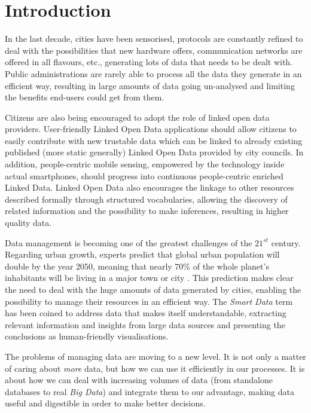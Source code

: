 \section{Introduction}
\label{sec:introduction}

In the last decade, cities have been sensorised, protocols are constantly refined to deal with the possibilities that new hardware offers, communication networks are offered in all flavours, etc., generating lots of data that needs to be dealt with. Public administrations are rarely able to process all the data they generate in an efficient way, resulting in large amounts of data going un-analysed and limiting the benefits end-users could get from them.

Citizens are also being encouraged to adopt the role of linked open data providers. User-friendly Linked Open Data applications should allow citizens to easily contribute with new trustable data which can be linked to already existing published (more static generally) Linked Open Data provided by city councils. In addition, people-centric mobile sensing, empowered by the technology inside actual smartphones, should progress into continuous people-centric enriched Linked Data. Linked Open Data also encourages the linkage to other resources described formally through structured vocabularies, allowing the discovery of related information and the possibility to make inferences, resulting in higher quality data.

Data management is becoming one of the greatest challenges of the $21^{st}$ century. Regarding urban growth, experts predict that global urban population will double by the year 2050, meaning that nearly 70\% of the whole planet's inhabitants will be living in a major town or city \cite{city2010urbanization}. This prediction makes clear the need to deal with the huge amounts of data generated by cities, enabling the possibility to manage their resources in an efficient way. The \textit{Smart Data} term has been coined to address data that makes itself understandable, extracting relevant information and insights from large data sources and presenting the conclusions as human-friendly visualisations.

The problems of managing data are moving to a new level. It is not only a matter of caring about \textit{more} data, but how we can use it efficiently in our processes. It is about how we can deal with increasing volumes of data (from standalone databases to real \textit{Big Data}) and integrate them to our advantage, making data useful and digestible in order to make better decisions.

